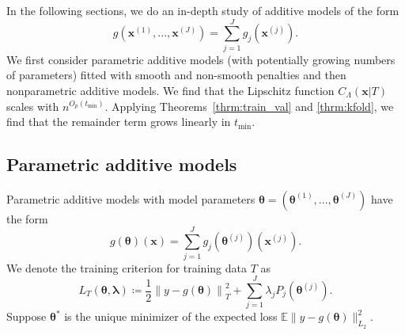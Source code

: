 \documentclass[12pt]{article} %
\theoremstyle{definition}
\begin{document}

In the following sections, we do an in-depth study of additive models of the form
\begin{equation}
g(\boldsymbol{x}^{(1)}, ..., \boldsymbol{x}^{(J)})= \sum_{j=1}^J g_j(\boldsymbol{x}^{(j)}).
\end{equation}
We first consider parametric additive models (with potentially growing numbers of parameters) fitted with smooth and non-smooth penalties and then nonparametric additive models.
We find that the Lipschitz function $C_\Lambda(\boldsymbol{x} | T)$ scales with $n^{O_p(t_{\min})}$.
Applying Theorems~\ref{thrm:train_val} and \ref{thrm:kfold}, we find that the remainder term grows linearly in $t_{\min}$.

\subsection{Parametric additive models}
\label{sec:param_add_models}
Parametric additive models with model parameters $\boldsymbol{\theta} = \left (\boldsymbol{\theta}^{(1)}, ..., \boldsymbol{\theta}^{(J)} \right )$ have the form
\begin{equation}
g(\boldsymbol{\theta})(\boldsymbol{x})
= \sum_{j=1}^J g_j(\boldsymbol{\theta}^{(j)})(\boldsymbol{x}^{(j)}).
\end{equation}
We denote the training criterion for training data $T$ as
\begin{equation}
\label{eq:param_add}
L_T \left (\boldsymbol{\theta}, \boldsymbol{\lambda} \right) 
\coloneqq \frac{1}{2} \left  \| y -  g(\boldsymbol{\theta}) \right \|^2_T 
+ \sum_{j=1}^J \lambda_j P_j(\boldsymbol{\theta}^{(j)}).
\end{equation}
Suppose $\boldsymbol{\theta}^*$ is the unique minimizer of the expected loss $\mathbb{E} \| y - g(\boldsymbol{\theta}) \|^2_{L_2}$.
\end{document}
